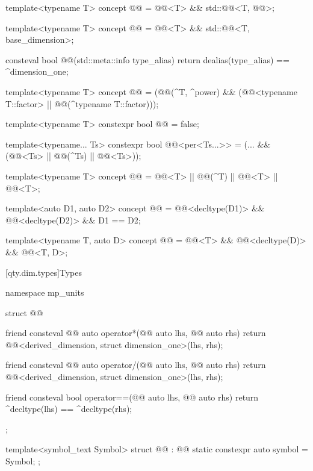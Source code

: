 \begin{itemdecl}
template<typename T>
concept @@ = @@<T> && std::@@<T, @@>;

template<typename T>
concept @@ = @@<T> && std::@@<T, base_dimension>;

consteval bool @@(std::meta::info type_alias) {
  return dealias(type_alias) == ^dimension_one;
}

template<typename T>
concept @@ =
  (@@(^T, ^power) &&
   (@@<typename T::factor> || @@(^typename T::factor)));

template<typename T>
constexpr bool @@ = false;

template<typename... Ts>
constexpr bool @@<per<Ts...>> =
  (... && (@@<Ts> || @@(^Ts) || @@<Ts>));

template<typename T>
concept @@ =
  @@<T> || @@(^T) || @@<T> || @@<T>;

template<auto D1, auto D2>
concept @@ = @@<decltype(D1)> && @@<decltype(D2)> && D1 == D2;

template<typename T, auto D>
concept @@ = @@<T> && @@<decltype(D)> && @@<T{}, D>;
\end{itemdecl}

[qty.dim.types]{Types}

\begin{codeblock}
namespace mp_units {

struct @@ {
  friend consteval @@ auto operator*(@@ auto lhs, @@ auto rhs)
  {
    return @@<derived_dimension, struct dimension_one>(lhs, rhs);
  }

  friend consteval @@ auto operator/(@@ auto lhs, @@ auto rhs)
  {
    return @@<derived_dimension, struct dimension_one>(lhs, rhs);
  }

  friend consteval bool operator==(@@ auto lhs, @@ auto rhs)
  {
    return ^decltype(lhs) == ^decltype(rhs);
  }
};

template<symbol_text Symbol>
struct @@ : @@ {
  static constexpr auto symbol = Symbol;
};

}
\end{codeblock}

